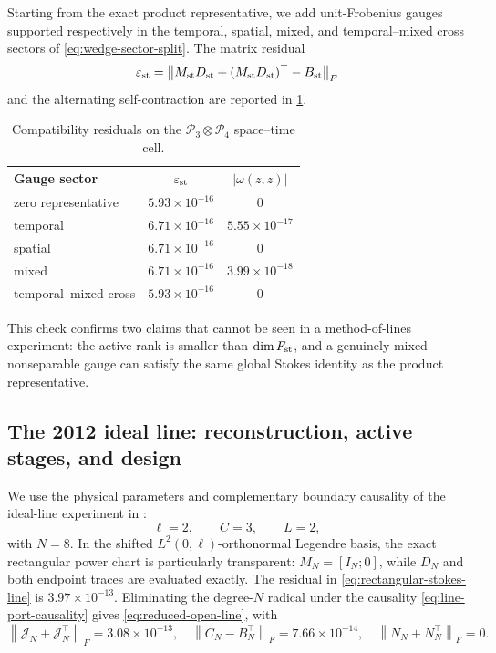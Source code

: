 \documentclass[11pt,a4paper]{article}
\newcommand{\cP}{\mathcal P}
\newcommand{\norm}[1]{\left\lVert #1\right\rVert}
\begin{document}
Starting from the exact product representative, we add unit-Frobenius
gauges supported respectively in the temporal, spatial, mixed, and
temporal--mixed cross sectors of \cref{eq:wedge-sector-split}.  The matrix
residual
\begin{equation}\label{eq:st-residual}
 \varepsilon_{\rm st}
 =\norm{M_{\rm st}D_{\rm st}
 +(M_{\rm st}D_{\rm st})^\top-B_{\rm st}}_F
\end{equation}
and the alternating self-contraction are reported in
\cref{tab:space-time-residuals}.

\begin{table}[htbp]
\centering
\caption{Compatibility residuals on the \(\cP_3\otimes\cP_4\)
space--time cell.}
\label{tab:space-time-residuals}
\begin{tabular}{@{}lcc@{}}
\toprule
Gauge sector & \(\varepsilon_{\rm st}\) & \(|\omega(z,z)|\) \\ \midrule
zero representative & \(5.93\times10^{-16}\) & \(0\) \\
temporal & \(6.71\times10^{-16}\) & \(5.55\times10^{-17}\) \\
spatial & \(6.71\times10^{-16}\) & \(0\) \\
mixed & \(6.71\times10^{-16}\) & \(3.99\times10^{-18}\) \\
temporal--mixed cross & \(5.93\times10^{-16}\) & \(0\) \\
\bottomrule
\end{tabular}
\end{table}

This check confirms two claims that cannot be seen in a method-of-lines
experiment: the active rank is smaller than \(\dim F_{\rm st}\), and a
genuinely mixed nonseparable gauge can satisfy the same global Stokes
identity as the product representative.

\subsection{The 2012 ideal line: reconstruction, active stages, and design}

We use the physical parameters and complementary boundary causality of the
ideal-line experiment in \cite{moulla2012}:
\[
 \ell=2,\qquad C=3,\qquad L=2,
\]
with \(N=8\).  In the shifted \(L^2(0,\ell)\)-orthonormal Legendre basis,
the exact rectangular power chart is particularly transparent:
\(M_N=[I_N;0]\), while \(D_N\) and both endpoint traces are evaluated
exactly.  The residual in \cref{eq:rectangular-stokes-line} is
\(3.97\times10^{-13}\).  Eliminating the degree-\(N\) radical under the
causality \cref{eq:line-port-causality} gives
\cref{eq:reduced-open-line}, with
\[
 \norm{\mathcal J_N+\mathcal J_N^\top}_F=3.08\times10^{-13},
 \quad
 \norm{C_N-B_N^\top}_F=7.66\times10^{-14},
 \quad
 \norm{N_N+N_N^\top}_F=0.
\]
\end{document}
